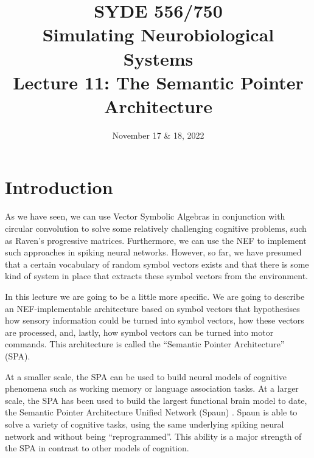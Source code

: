 \documentclass[10pt,letterpaper,oneside]{article}
\date{November 17 \& 18, 2022}
\title{SYDE 556/750 \\ Simulating Neurobiological Systems \\ Lecture 11: The Semantic Pointer Architecture}
\begin{document}

\section{Introduction}


As we have seen, we can use Vector Symbolic Algebras in conjunction with circular convolution to solve some relatively challenging cognitive problems, such as Raven's progressive matrices. Furthermore, we can use the NEF to implement such approaches in spiking neural networks. However, so far, we have presumed that a certain vocabulary of random symbol vectors exists and that there is some kind of system in place that extracts these symbol vectors from the environment.

In this lecture we are going to be a little more specific. We are going to describe an NEF-implementable architecture based on symbol vectors that hypothesises how sensory information could be turned into symbol vectors, how these vectors are processed, and, lastly, how symbol vectors can be turned into motor commands. This architecture is called the \enquote{Semantic Pointer Architecture} (SPA).

At a smaller scale, the SPA can be used to build neural models of cognitive phenomena such as working memory or language association tasks. At a larger scale, the SPA has been used to build the largest functional brain model to date, the Semantic Pointer Architecture Unified Network (Spaun) \cite{eliasmith2012largescale,choo2018spaun}. Spaun is able to solve a variety of cognitive tasks, using the same underlying spiking neural network and without being \enquote{reprogrammed}. This ability is a major strength of the SPA in contrast to other models of cognition.
\end{document}
